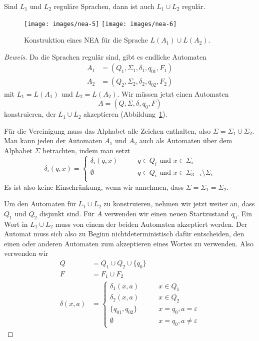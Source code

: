 \begin{satz}
\label{satz_union}
Sind $L_1$ und $L_2$ reguläre Sprachen, dann
ist auch $L_1\cup L_2$ regulär.
\end{satz}

\begin{figure}
\begin{center}
\texttt{[image: images/nea-5]}
\qquad \qquad
\texttt{[image: images/nea-6]}
\end{center}
\caption{Konstruktion eines NEA 
für die Sprache $L(A_1)\cup L(A_2)$.\label{regulaer:vereinigung}}
\end{figure}

\begin{proof}[Beweis]
Da die Sprachen regulär sind, gibt es endliche Automaten 
\begin{align*}
A_1&=(Q_1,\Sigma_1,\delta_1, q_{01}, F_1)\\
A_2&=(Q_2,\Sigma_2,\delta_2, q_{02}, F_2)
\end{align*}
mit $L_1=L(A_1)$ und $L_2=L(A_2)$.
Wir müssen
jetzt einen Automaten
\[
A = (Q, \Sigma, \delta, q_0, F)
\]
konstruieren, der $L_1\cup L_2$ akzeptieren
(Abbildung~\ref{regulaer:vereinigung}).

Für die Vereinigung muss das Alphabet alle Zeichen enthalten,
also $\Sigma = \Sigma_1\cup\Sigma_2$.
Man kann jeden der Automaten 
$A_1$ und $A_2$ auch als Automaten über dem Alphabet $\Sigma$
betrachten, indem man setzt
\[
\delta_i(q, x)=\begin{cases}
\delta_i(q,x)&\qquad q\in Q_i\text{ und } x\in \Sigma_i\\
\emptyset&\qquad q\in Q_i\text{ und } x\in \Sigma_{3-i}\setminus \Sigma_i\\
\end{cases}
\]
Es ist also keine Einschränkung, wenn wir annehmen, dass
$\Sigma=\Sigma_1=\Sigma_2$.

Um den Automaten für $L_1\cup L_2$ zu konstruieren, nehmen wir jetzt
weiter an, dass $Q_1$ und $Q_2$ disjunkt sind.
Für $A$ verwenden wir einen neuen Startzustand $q_0$.
Ein Wort in $L_1\cup L_2$ muss von einem der beiden Automaten
akzeptiert werden.
Der Automat muss sich also zu Beginn nichtdeterministisch
dafür entscheiden, den einen oder anderen Automaten zum
akzeptieren eines Wortes zu verwenden.
Also verwenden wir 
\begin{align*}
Q&=Q_1\cup Q_2\cup \{q_0\}\\
F&=F_1\cup F_2\\
\delta(x,a)&=\begin{cases}
\delta_1(x,a)&\qquad x\in Q_1\\
\delta_2(x,a)&\qquad x\in Q_2\\
\{q_{01}, q_{02}\}&\qquad x=q_0, a=\varepsilon\\
\emptyset&\qquad x=q_0, a\ne\varepsilon
\end{cases}
\end{align*}
\end{proof}

